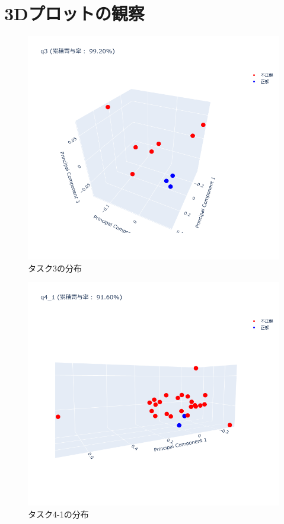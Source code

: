 \documentclass[paper=a4paper,fontsize=10pt]{jlreq}
\begin{document}
  \section{3Dプロットの観察}
    \begin{figure}[htbp]
      \centering
      \includegraphics[width=0.8\linewidth]{3dplot_q3.png}
      \caption{タスク3の分布}
    \end{figure}
    \FloatBarrier
    \begin{figure}[htbp]
      \centering
      \includegraphics[width=0.8\linewidth]{3dplot_q4_1.png}
      \caption{タスク4-1の分布}
    \end{figure}
    \FloatBarrier
\end{document}
